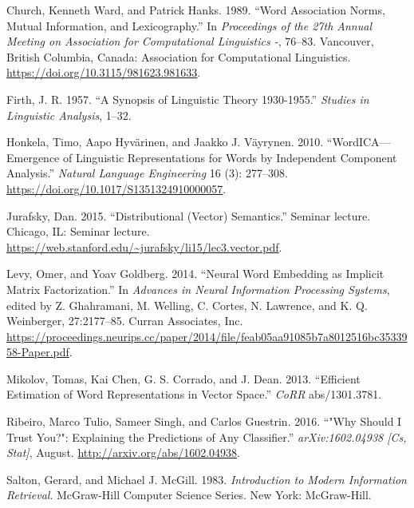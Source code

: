 \documentclass{article}
\begin{document}
\leavevmode\hypertarget{ref-church_word_1989}{}%
Church, Kenneth Ward, and Patrick Hanks. 1989. ``Word Association Norms,
Mutual Information, and Lexicography.'' In \emph{Proceedings of the 27th
Annual Meeting on Association for Computational Linguistics -}, 76--83.
Vancouver, British Columbia, Canada: Association for Computational
Linguistics. \url{https://doi.org/10.3115/981623.981633}.

\leavevmode\hypertarget{ref-firth_synopsis_1957}{}%
Firth, J. R. 1957. ``A Synopsis of Linguistic Theory 1930-1955.''
\emph{Studies in Linguistic Analysis}, 1--32.

\leavevmode\hypertarget{ref-honkela_wordicaemergence_2010}{}%
Honkela, Timo, Aapo Hyvärinen, and Jaakko J. Väyrynen. 2010.
``WordICA---Emergence of Linguistic Representations for Words by
Independent Component Analysis.'' \emph{Natural Language Engineering} 16
(3): 277--308. \url{https://doi.org/10.1017/S1351324910000057}.

\leavevmode\hypertarget{ref-jurafsky_distributional_2015}{}%
Jurafsky, Dan. 2015. ``Distributional (Vector) Semantics.'' Seminar
lecture. Chicago, IL: Seminar lecture.
\url{https://web.stanford.edu/~jurafsky/li15/lec3.vector.pdf}.

\leavevmode\hypertarget{ref-levy_neural_2014}{}%
Levy, Omer, and Yoav Goldberg. 2014. ``Neural Word Embedding as Implicit
Matrix Factorization.'' In \emph{Advances in Neural Information
Processing Systems}, edited by Z. Ghahramani, M. Welling, C. Cortes, N.
Lawrence, and K. Q. Weinberger, 27:2177--85. Curran Associates, Inc.
\url{https://proceedings.neurips.cc/paper/2014/file/feab05aa91085b7a8012516bc3533958-Paper.pdf}.

\leavevmode\hypertarget{ref-mikolov_efficient_2013}{}%
Mikolov, Tomas, Kai Chen, G. S. Corrado, and J. Dean. 2013. ``Efficient
Estimation of Word Representations in Vector Space.'' \emph{CoRR}
abs/1301.3781.

\leavevmode\hypertarget{ref-ribeiro_why_2016}{}%
Ribeiro, Marco Tulio, Sameer Singh, and Carlos Guestrin. 2016. ``"Why
Should I Trust You?": Explaining the Predictions of Any Classifier.''
\emph{arXiv:1602.04938 {[}Cs, Stat{]}}, August.
\url{http://arxiv.org/abs/1602.04938}.

\leavevmode\hypertarget{ref-salton_introduction_1983}{}%
Salton, Gerard, and Michael J. McGill. 1983. \emph{Introduction to
Modern Information Retrieval}. McGraw-Hill Computer Science Series. New
York: McGraw-Hill.

\newpage
\end{document}
